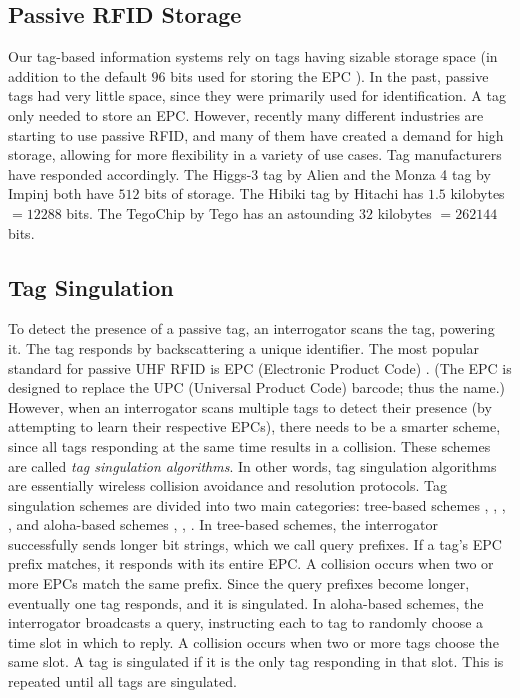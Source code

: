 \subsection{Passive RFID Storage}
Our tag-based information systems rely on tags having sizable storage space (in addition to the default $96$ bits used for storing the EPC \cite{EPCglobal}). In the past, passive tags had very little space, since they were primarily used for identification. A tag only needed to store an EPC. However, recently many different industries are starting to use passive RFID, and many of them have created a demand for high storage, allowing for more flexibility in a variety of use cases. Tag manufacturers have responded accordingly. The Higgs-3 tag by Alien \cite{Alien} and the Monza 4 tag by Impinj \cite{Impinj} both have $512$ bits of storage. The Hibiki tag by Hitachi \cite{Hitachi} has $1.5$ kilobytes $= 12288$ bits. The TegoChip by Tego \cite{Tego} has an astounding $32$ kilobytes $= 262144$ bits.

\subsection{Tag Singulation}
To detect the presence of a passive tag, an interrogator scans the tag, powering it. The tag responds by backscattering a unique identifier. The most popular standard for passive UHF RFID is EPC (Electronic Product Code) \cite{EPCglobal}. (The EPC is designed to replace the UPC (Universal Product Code) barcode; thus the name.) However, when an interrogator scans multiple tags to detect their presence (by attempting to learn their respective EPCs), there needs to be a smarter scheme, since all tags responding at the same time results in a collision. These schemes are called \emph{tag singulation algorithms}. In other words, tag singulation algorithms are essentially wireless collision avoidance and resolution protocols. Tag singulation schemes are divided into two main categories: tree-based schemes \cite{2000 Law}, \cite{2006 Chiang}, \cite{2006 Myung}, \cite{2006 Bhandari}, \cite{2008 Hsu} and aloha-based schemes \cite{2002 Vogt}, \cite{2005 Zhen}, \cite{2006 Huang}. In tree-based schemes, the interrogator successfully sends longer bit strings, which we call query prefixes. If a tag's EPC prefix matches, it responds with its entire EPC. A collision occurs when two or more EPCs match the same prefix. Since the query prefixes become longer, eventually one tag responds, and it is singulated. In aloha-based schemes, the interrogator broadcasts a query, instructing each to tag to randomly choose a time slot in which to reply. A collision occurs when two or more tags choose the same slot. A tag is singulated if it is the only tag responding in that slot. This is repeated until all tags are singulated.

